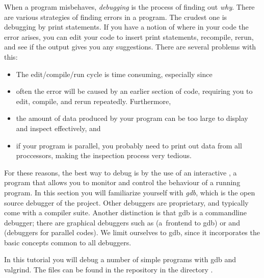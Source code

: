 

When a program misbehaves, \emph{debugging} is the process of finding
out \emph{why}.
There are various strategies of finding errors in a program.
The crudest one is debugging by print statements. If you have a
notion of where in your code the error arises, you can edit your code
to insert print statements, recompile, rerun, and see if the output
gives you any suggestions. There are several problems with this:
\begin{itemize}
\item The edit/compile/run cycle is time consuming, especially since
\item often the error will be caused by an earlier section of code,
  requiring you to edit, compile, and rerun repeatedly. Furthermore,
\item the amount of data produced by your program can be too large to
  display and inspect effectively, and
\item if your program is parallel, you probably need to print out data
  from all proccessors, making the inspection process very tedious.
\end{itemize}


For these reasons, the best way to debug is by the use of an
interactive , a program that allows you to monitor
and control the behaviour of a running program. In this section you
will familiarize yourself with
\emph{gdb}, which is the open source
debugger of the  project. Other debuggers are
proprietary, and typically come with a compiler suite. Another
distinction is that gdb is a commandline debugger; there are
graphical debuggers such as  (a~frontend to gdb) or
 and  (debuggers for parallel
codes). We limit ourselves to gdb, since it incorporates the basic
concepts common to all debuggers.

In this tutorial you will debug a number of simple programs with
gdb and valgrind. The files can be found in the repository
in the directory .

